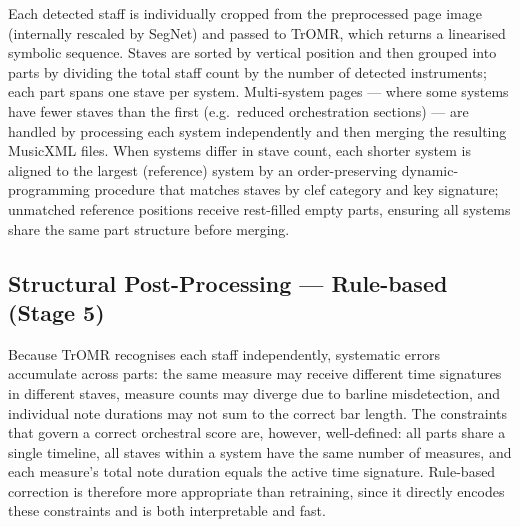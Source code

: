 \documentclass[11pt,a4paper]{article}
\begin{document}
Each detected staff is individually cropped from the preprocessed page image (internally rescaled by SegNet) and passed to TrOMR, which returns a linearised symbolic sequence.
Staves are sorted by vertical position and then grouped into parts by dividing the total staff count by the number of detected instruments; each part spans one stave per system.
Multi-system pages — where some systems have fewer staves than the first (e.g.\ reduced orchestration sections) — are handled by processing each system independently and then merging the resulting MusicXML files.
When systems differ in stave count, each shorter system is aligned to the largest (reference) system by an order-preserving dynamic-programming procedure that matches staves by clef category and key signature; unmatched reference positions receive rest-filled empty parts, ensuring all systems share the same part structure before merging.

\subsection{Structural Post-Processing --- Rule-based (Stage 5)}
%

Because TrOMR recognises each staff independently, systematic errors accumulate across parts: the same measure may receive different time signatures in different staves, measure counts may diverge due to barline misdetection, and individual note durations may not sum to the correct bar length.
The constraints that govern a correct orchestral score are, however, well-defined: all parts share a single timeline, all staves within a system have the same number of measures, and each measure's total note duration equals the active time signature.
Rule-based correction is therefore more appropriate than retraining, since it directly encodes these constraints and is both interpretable and fast.
\end{document}
